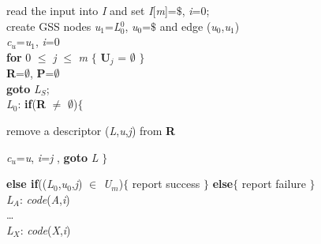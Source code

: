\noindent read the input into \textit{I} and set \textit{I}[\textit{m}]=$\$$, \textit{i}=0;\\
create GSS nodes \textit{u}$_1$=\textit{L}$_0^{0}$, \textit{u}$_0$=$\$$ and edge (\textit{u}$_0$,\textit{u}$_1$)\\
\textit{c}$_u$=\textit{u}$_1$, \textit{i}=0\\
\textbf{for} 0 $\le$ \textit{j} $\le$ \textit{m} $\{$ \textbf{U$_j$} = $\emptyset$ $\}$\\
\textbf{R}=$\emptyset$, \textbf{P}=$\emptyset$\\
\textbf{goto} \textit{L}$_S$;\\
\textit{L}$_0$: \textbf{if}(\textbf{R} $\ne$ $\emptyset$)$\{$\par
\hspace{2cm} remove a descriptor (\textit{L},\textit{u},\textit{j}) from \textbf{R}\par
\hspace{2cm} \textit{c}$_u$=\textit{u}, \textit{i}=\textit{j} , \textbf{goto} \textit{L} $\}$\par
\hspace{0.1cm} \textbf{else if}((\textit{L}$_0$,\textit{u}$_0$,\textit{j}) $\in$ \textit{U}$_m$)$\{$ report success $\}$ \textbf{else}$\{$ report failure $\}$\\
\textit{L}$_A$: \textit{code}(\textit{A},\textit{i})\\
\dots \\
\textit{L}$_X$: \textit{code}(\textit{X},\textit{i})